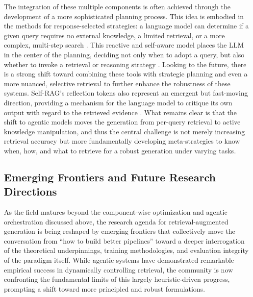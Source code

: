 \documentclass[11pt,a4paper]{article}
\begin{document}
The integration of these multiple components is often achieved through the development of a more sophisticated planning process. This idea is embodied in the methods for response-selected strategies: a language model can determine if a given query requires no external knowledge, a limited retrieval, or a more complex, multi-step search \cite{arxiv:2407.16833v1}. This reactive and self-aware model places the LLM in the center of the planning, deciding not only when to adopt a query, but also whether to invoke a retrieval or reasoning strategy \cite{arxiv:2407.16833v1}. Looking to the future, there is a strong shift toward combining these tools with strategic planning and even a more nuanced, selective retrieval to further enhance the robustness of these systems. Self-RAG's reflection tokens also represent an emergent but fast-moving direction, providing a mechanism for the language model to critique its own output with regard to the retrieved evidence \cite{arxiv:2310.11511v1}. What remains clear is that the shift to agentic models moves the generation from per-query retrieval to active knowledge manipulation, and thus the central challenge is not merely increasing retrieval accuracy but more fundamentally developing meta-strategies to know when, how, and what to retrieve for a robust generation under varying tasks.


\subsection{Emerging Frontiers and Future Research Directions}


As the field matures beyond the component-wise optimization and agentic orchestration discussed above, the research agenda for retrieval-augmented generation is being reshaped by emerging frontiers that collectively move the conversation from ``how to build better pipelines'' toward a deeper interrogation of the theoretical underpinnings, training methodologies, and evaluation integrity of the paradigm itself. While agentic systems have demonstrated remarkable empirical success in dynamically controlling retrieval, the community is now confronting the fundamental limits of this largely heuristic-driven progress, prompting a shift toward more principled and robust formulations.
\end{document}
